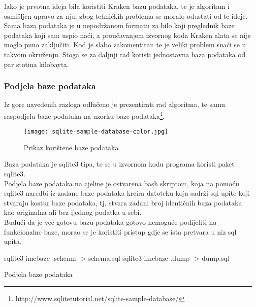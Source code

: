 \documentclass[times, utf8, zavrsni]{fer}
\begin{document}
{Iako je prvotna ideja bila koristiti Kraken bazu podataka, te je algoritam i osmišljen upravo za nju, zbog tehničkih problema se moralo odustati od te ideje. Sama baza podataka je u nepodržanom formatu za bilo koji preglednik baze podataka koji sam uspio naći, a proučavanjem izvornog koda Kraken alata se nije moglo puno zaključiti. Kod je slabo zakomentiran te je veliki problem snaći se u takvom okruženju. Stoga se za daljnji rad koristi jednostavna baza podataka od par stotina kilobayta.

\subsubsection{Podjela baze podataka}
Iz gore navedenih razloga odlučeno je prezentirati rad algoritma, te samu raspodjelu baze podataka na uzorku baze podataka\footnote{http://www.sqlitetutorial.net/sqlite-sample-database/}.
\begin{figure}[!htbp]
	\centering
	\texttt{[image: sqlite-sample-database-color.jpg]}
	\caption{Prikaz korištene baze podataka}
	\label{Db}
\end{figure}
Baza podataka je sqlite3 tipa, te se u izvornom kodu programa koristi paket sqlite3.\\
Podjela baze podataka na cjeline je ostvarena bash skriptom, koja na pomoću sqlite3 naredbi iz zadane baze podataka kreira datoteku koja sadrži sql upite koji stvaraju kostur baze podataka, tj. stvara zadani broj identičnih baza podataka kao originalna ali bez ijednog podatka u sebi.\\ Budući da je već gotovu bazu podataka gotovo nemoguće podijeliti na funkcionalne baze, morao se je koristiti pristup gdje se ista pretvara u niz sql upita.

\begin{algorithm}[H]
		sqlite3 imebaze .schenm -> schema.sql\;
		sqlite3 imebaze .dump -> dump.sql\;
	\caption{Podjela baze podataka}
	\label{PodjelaBp}
\end{algorithm}

}
\end{document}
